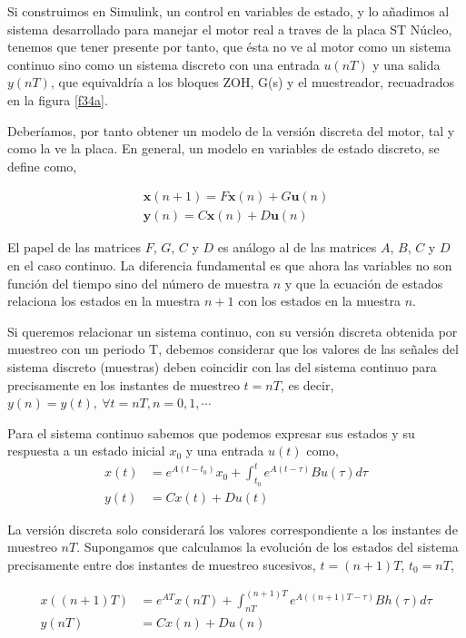 \documentclass[10pt,a4paper]{report}
\begin{document}
Si construimos en Simulink, un control en variables de estado, y lo añadimos al sistema desarrollado para manejar el motor real a traves de la placa ST Núcleo,  tenemos que tener presente por tanto, que ésta no ve al motor como un sistema continuo sino como un sistema discreto con una entrada $u(nT)$ y una salida $y(nT)$, que equivaldría a los bloques  ZOH, G(s) y el muestreador, recuadrados en la figura \ref{f34a}.

Deberíamos, por tanto obtener un modelo de la versión discreta del motor, tal y como la ve la placa.  En general, un modelo en variables de estado discreto, se define como,

 \begin{align}
\mathbf{x}(n+1) = F\mathbf{x}(n) + G\mathbf{u}(n) \label{eq42}\\
\mathbf{y}(n)  = C\mathbf{x}(n)+D\mathbf{u}(n) \label{eq43}
\end{align} 

El papel de las matrices $F$, $G$, $C$ y $D$ es análogo al de las matrices $A$, $B$, $C$ y $D$ en el caso continuo. La diferencia fundamental es que ahora las variables no son función del tiempo sino del número de muestra $n$ y que la ecuación de estados relaciona los estados en la muestra $n+1$ con los estados en la muestra $n$.

Si queremos relacionar un sistema continuo, con su versión discreta obtenida por muestreo con un periodo T, debemos considerar que los valores de las señales del sistema discreto (muestras) deben coincidir con las del sistema continuo para precisamente en los instantes de muestreo $t = nT$, es decir, $y(n) = y(t),\ \forall t = nT, n = 0,1,\cdots$ 

Para el sistema continuo sabemos que podemos expresar sus estados y su respuesta a un estado inicial $x_0$ y una entrada $u(t)$ como,
\begin{align}
x(t) &= e^{A(t-t_0)}x_0 + \int_{t_0}^t e^{A(t-\tau)}Bu(\tau)d\tau\\
y(t) &= Cx(t) + Du(t)
\end{align}

La versión discreta solo considerará los valores correspondiente a los instantes de muestreo $nT$. Supongamos que calculamos la evolución de los estados del sistema precisamente entre dos instantes de muestreo sucesivos, $t=(n+1)T$, $t_0=nT$,

\begin{align}
x((n+1)T) &= e^{AT}x(nT) + \int_{nT}^{(n+1)T} e^{A((n+1)T-\tau)}Bh(\tau)d\tau\\
y(nT) &= Cx(n) + Du(n)
\end{align}
\end{document}
